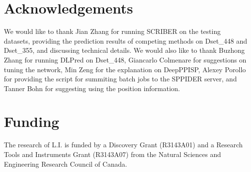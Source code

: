 \documentclass{bioinfo}
\begin{document}
\section*{Acknowledgements}
We would like to thank Jian Zhang for running SCRIBER on the testing datasets, providing the prediction results of competing methods on Dset\_448 and Dset\_355, and discussing technical details. We would also like to thank Buzhong Zhang for running DLPred on Dset\_448, Giancarlo Colmenare for suggestions on tuning the network, Min Zeng for the explanation on DeepPPISP, Alexey Porollo for providing the script for summiting batch jobs to the SPPIDER server, and Tanner Bohn for suggesting using the position information.

\section*{Funding}
The research of L.I. is funded by a Discovery Grant (R3143A01) and a Research Tools and Instruments Grant (R3143A07) from the Natural Sciences and Engineering Research Council of Canada.



%

\end{document}
